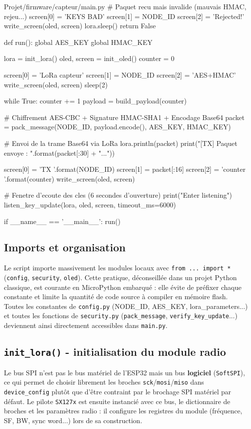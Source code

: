 \documentclass[a4paper,11pt]{report}
\begin{document}
\begin{pycode}{Projet/firmware/capteur/main.py}
    # Paquet recu mais invalide (mauvais HMAC, rejeu...)
    screen[0] = 'KEYS BAD'
    screen[1] = NODE_ID
    screen[2] = 'Rejected!'
    write_screen(oled, screen)
    lora.sleep()
    return False


def run():
    global AES_KEY
    global HMAC_KEY

    lora = init_lora()
    oled, screen = init_oled()
    counter = 0

    screen[0] = 'LoRa capteur'
    screen[1] = NODE_ID
    screen[2] = 'AES+HMAC'
    write_screen(oled, screen)
    sleep(2)

    while True:
        counter += 1
        payload = build_payload(counter)

        # Chiffrement AES-CBC + Signature HMAC-SHA1 + Encodage Base64
        packet = pack_message(NODE_ID, payload.encode(), AES_KEY, HMAC_KEY)

        # Envoi de la trame Base64 via LoRa
        lora.println(packet)
        print("[TX] Paquet envoye : {}".format(packet[:30] + "..."))

        screen[0] = 'TX {}'.format(NODE_ID)
        screen[1] = packet[:16]
        screen[2] = 'counter {}'.format(counter)
        write_screen(oled, screen)

        # Fenetre d'ecoute des cles (6 secondes d'ouverture)
        print("Enter listening")
        listen_key_update(lora, oled, screen, timeout_ms=6000)

if __name__ == '__main__':
    run()
\end{pycode}

\subsection{Imports et organisation}
Le script importe massivement les modules locaux avec \texttt{from ... import *}
(\texttt{config}, \texttt{security}, \texttt{oled}). Cette pratique, déconseillée dans un projet Python
classique, est courante en MicroPython embarqué : elle évite de préfixer chaque constante et limite la
quantité de code source à compiler en mémoire flash. Toutes les constantes de \texttt{config.py} (NODE\_ID,
AES\_KEY, lora\_parameters...) et toutes les fonctions de \texttt{security.py} (\texttt{pack\_message},
\texttt{verify\_key\_update}...) deviennent ainsi directement accessibles dans \texttt{main.py}.

\subsection{\texttt{init\_lora()} - initialisation du module radio}
Le bus SPI n'est pas le bus matériel de l'ESP32 mais un bus \textbf{logiciel} (\texttt{SoftSPI}), ce qui
permet de choisir librement les broches \texttt{sck}/\texttt{mosi}/\texttt{miso} dans
\texttt{device\_config} plutôt que d'être contraint par le brochage SPI matériel par défaut. Le pilote
\texttt{SX127x} est ensuite instancié avec ce bus, le dictionnaire de broches et les paramètres radio :
il configure les registres du module (fréquence, SF, BW, sync word...) lors de sa construction.
\end{document}
